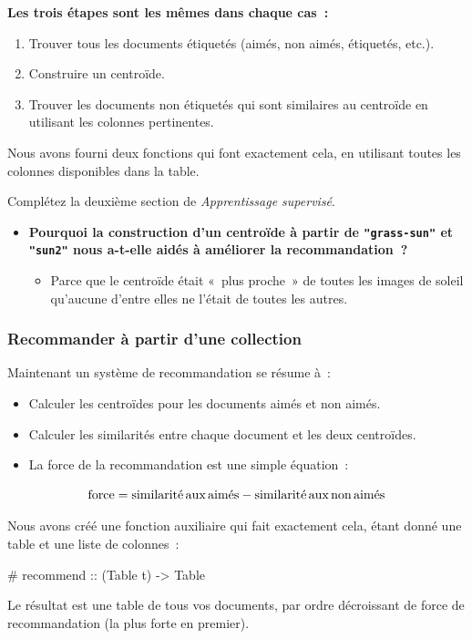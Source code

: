 \documentclass[12pt,a4paper]{article}
\newcommand{\contrat}[1]{%
  \begin{contractbox}
    \ttfamily #1
  \end{contractbox}
}
\begin{document}
\begin{keypointbox}
  \textbf{Les trois étapes sont les mêmes dans chaque cas~:}
  \begin{enumerate}
    \item Trouver tous les documents étiquetés (aimés, non aimés, étiquetés, etc.).
    \item Construire un centroïde.
    \item Trouver les documents non étiquetés qui sont similaires au centroïde en utilisant les colonnes pertinentes.
  \end{enumerate}
\end{keypointbox}

\begin{activitybox}
  Nous avons fourni deux fonctions qui font exactement cela, en utilisant toutes les colonnes disponibles dans la table.

  Complétez la deuxième section de \emph{Apprentissage supervisé}.
\end{activitybox}

\begin{thinkbox}
  \begin{itemize}
    \item \textbf{Pourquoi la construction d'un centroïde à partir de \texttt{"grass-sun"} et \texttt{"sun2"} nous a-t-elle aidés à améliorer la recommandation~?}
    \begin{itemize}
      \item Parce que le centroïde était «~plus proche~» de toutes les images de soleil qu'aucune d'entre elles ne l'était de toutes les autres.
    \end{itemize}
  \end{itemize}
\end{thinkbox}

\subsubsection{Recommander à partir d'une collection}

\begin{keypointbox}
  Maintenant un système de recommandation se résume à~:
  \begin{itemize}
    \item Calculer les centroïdes pour les documents aimés et non aimés.
    \item Calculer les similarités entre chaque document et les deux centroïdes.
    \item La force de la recommandation est une simple équation~:
  \end{itemize}

  \[
  \text{force} = \text{similarité\,aux\,aimés} - \text{similarité\,aux\,non\,aimés}
  \]

  Nous avons créé une fonction auxiliaire qui fait exactement cela, étant donné une table et une liste de colonnes~:

  \contrat{\# recommend :: (Table t) -> Table}

  Le résultat est une table de tous vos documents, par ordre décroissant de force de recommandation (la plus forte en premier).
\end{keypointbox}
\end{document}
